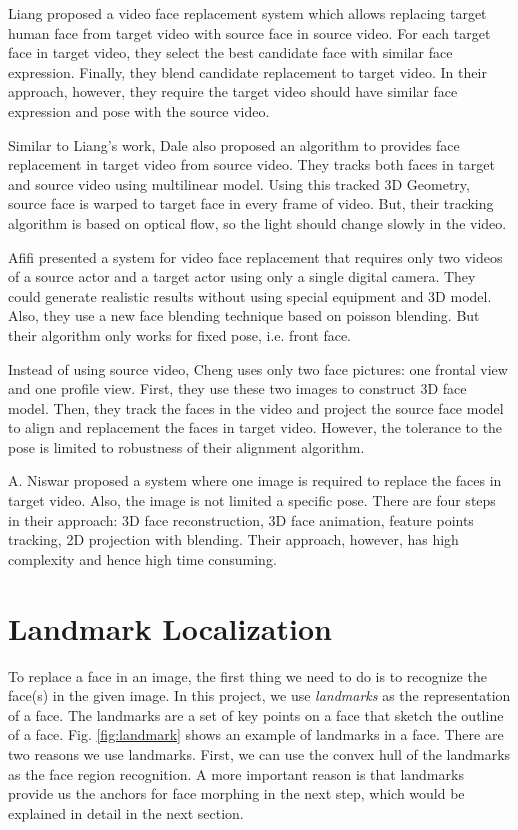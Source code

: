 \documentclass[10pt,twocolumn,letterpaper]{article}
\begin{document}
Liang \cite{liang2009image} proposed a video face replacement system which allows replacing target human face from
target video with source face in source video. For each target face in target video, they select the best candidate face with similar face expression. Finally, they blend candidate replacement to target video. In their approach, however, they require the target video should have similar face expression and pose with the source video. 

Similar to Liang's work, Dale \cite{dale2011video} also proposed an algorithm to provides face replacement in target video from source video. They tracks both faces in target and source video using multilinear model. Using this tracked 3D Geometry, source face is warped to target face in every frame of video. But, their tracking algorithm is based on optical flow, so the light should change slowly in the video.

Afifi \cite{afifi2014video} presented a system for video face replacement that requires only two videos of a source actor and a target actor using only a single digital camera. They could generate realistic results without using special equipment and 3D model. Also, they use a new face blending technique based on poisson blending. But their algorithm only works for fixed pose, i.e. front face.

Instead of using source video, Cheng \cite{cheng20093d} uses only two face pictures: one frontal view and one profile view. First, they use these two images to construct 3D face model. Then, they track the faces in the video and project the source face model to align and replacement the faces in target video. However, the tolerance to the pose is limited to robustness of their alignment algorithm.

A. Niswar \cite{niswar2012face} proposed a system where one image is required to replace the faces in target video. Also, the image is not limited a specific pose. There are four steps in their approach: 3D face reconstruction, 3D face animation, feature points tracking, 2D projection with blending. Their approach, however, has high complexity and hence high time consuming. 

\section{Landmark Localization}
\label{sec:landmark}
To replace a face in an image, the first thing we need to do is to recognize the face(s) in the given image. In this project, we use \emph{landmarks} as the representation of a face. The landmarks are a set of key points on a face that sketch the outline of a face. Fig. \ref{fig:landmark} shows an example of landmarks in a face. There are two reasons we use landmarks. First, we can use the convex hull of the landmarks as the face region recognition. A more important reason is that landmarks provide us the anchors for face morphing in the next step, which would be explained in detail in the next section. 
\end{document}
